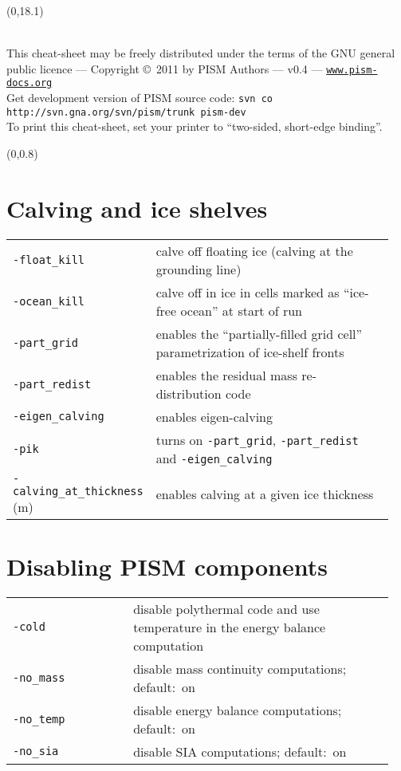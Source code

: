 \documentclass[landscape]{article}
\newcommand{\PISMDOWNLOADMSG}{Get development version of PISM source code: \texttt{svn co http://svn.gna.org/svn/pism/trunk pism-dev}}
\begin{document}
\null\newpage
\begin{textblock}{47}(0,18.1)
  \begin{center}
    \hrulefill\\
    This cheat-sheet may be freely distributed under the terms of the GNU general
    public licence --- Copyright \copyright\ 2011 by PISM Authors --- v0.4 ---
    \href{http://www.pism-docs.org}{\texttt{www.pism-docs.org}}\\
    \PISMDOWNLOADMSG\\
    To print this cheat-sheet, set your printer to ``two-sided, short-edge binding''.
 \end{center}
\end{textblock}

\begin{textblock}{15}(0,0.8)

\section{Calving and ice shelves}
\label{sec:calving}
\begin{tabular}{@{}p{0.3\linewidth}p{0.65\linewidth}@{}}
  \texttt{-float_kill} & calve off floating ice (calving at the grounding
  line)\\
\texttt{-ocean_kill} & calve off in ice in cells marked as ``ice-free
ocean'' at start of run\\
\texttt{-part_grid} & enables the ``partially-filled grid cell''
parametrization of ice-shelf fronts\\
\texttt{-part_redist} & enables the residual mass re-distribution code\\
\texttt{-eigen_calving} & enables eigen-calving\\
\texttt{-pik} & turns on \texttt{-part_grid}, \texttt{-part_redist} and
\texttt{-eigen_calving}\\
\texttt{-calving_at_thickness} (m) & enables calving at a given ice thickness\\
\end{tabular}

\section{Disabling PISM components}
\label{sec:switches}
\begin{tabular}{@{}p{0.3\linewidth}p{0.65\linewidth}@{}}
\texttt{-cold} & disable polythermal code and use temperature in the energy
balance computation\\
\texttt{-no_mass} & disable mass continuity computations; \mbox{default: on}\\
\texttt{-no_temp} & disable energy balance computations; \mbox{default: on}\\
\texttt{-no_sia} & disable SIA computations; \mbox{default: on}
\end{tabular}


\end{textblock}
\end{document}
